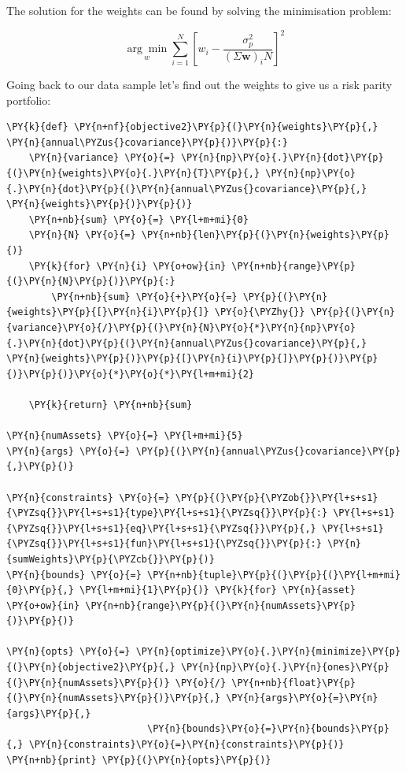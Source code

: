 The solution for the weights can be found by solving the minimisation
problem:

\[ \underset{w}{\arg \min } \sum _{i=1}^{N}\left[w_{i}-{\frac {\sigma_p^{2}}{(\Sigma \mathbf{w})_{i}N}}\right]^{2} \]

Going back to our data sample let's find out the weights to give us a
risk parity portfolio:

\begin{tcolorbox}[breakable, size=fbox, boxrule=1pt, pad at break*=1mm,colback=cellbackground, colframe=cellborder]
\begin{Verbatim}[commandchars=\\\{\}]
\PY{k}{def} \PY{n+nf}{objective2}\PY{p}{(}\PY{n}{weights}\PY{p}{,} \PY{n}{annual\PYZus{}covariance}\PY{p}{)}\PY{p}{:}
    \PY{n}{variance} \PY{o}{=} \PY{n}{np}\PY{o}{.}\PY{n}{dot}\PY{p}{(}\PY{n}{weights}\PY{o}{.}\PY{n}{T}\PY{p}{,} \PY{n}{np}\PY{o}{.}\PY{n}{dot}\PY{p}{(}\PY{n}{annual\PYZus{}covariance}\PY{p}{,} \PY{n}{weights}\PY{p}{)}\PY{p}{)}
    \PY{n+nb}{sum} \PY{o}{=} \PY{l+m+mi}{0}
    \PY{n}{N} \PY{o}{=} \PY{n+nb}{len}\PY{p}{(}\PY{n}{weights}\PY{p}{)}
    \PY{k}{for} \PY{n}{i} \PY{o+ow}{in} \PY{n+nb}{range}\PY{p}{(}\PY{n}{N}\PY{p}{)}\PY{p}{:}
        \PY{n+nb}{sum} \PY{o}{+}\PY{o}{=} \PY{p}{(}\PY{n}{weights}\PY{p}{[}\PY{n}{i}\PY{p}{]} \PY{o}{\PYZhy{}} \PY{p}{(}\PY{n}{variance}\PY{o}{/}\PY{p}{(}\PY{n}{N}\PY{o}{*}\PY{n}{np}\PY{o}{.}\PY{n}{dot}\PY{p}{(}\PY{n}{annual\PYZus{}covariance}\PY{p}{,} \PY{n}{weights}\PY{p}{)}\PY{p}{[}\PY{n}{i}\PY{p}{]}\PY{p}{)}\PY{p}{)}\PY{p}{)}\PY{o}{*}\PY{o}{*}\PY{l+m+mi}{2}
        
    \PY{k}{return} \PY{n+nb}{sum}

\PY{n}{numAssets} \PY{o}{=} \PY{l+m+mi}{5}
\PY{n}{args} \PY{o}{=} \PY{p}{(}\PY{n}{annual\PYZus{}covariance}\PY{p}{,}\PY{p}{)}

\PY{n}{constraints} \PY{o}{=} \PY{p}{(}\PY{p}{\PYZob{}}\PY{l+s+s1}{\PYZsq{}}\PY{l+s+s1}{type}\PY{l+s+s1}{\PYZsq{}}\PY{p}{:} \PY{l+s+s1}{\PYZsq{}}\PY{l+s+s1}{eq}\PY{l+s+s1}{\PYZsq{}}\PY{p}{,} \PY{l+s+s1}{\PYZsq{}}\PY{l+s+s1}{fun}\PY{l+s+s1}{\PYZsq{}}\PY{p}{:} \PY{n}{sumWeights}\PY{p}{\PYZcb{}}\PY{p}{)}
\PY{n}{bounds} \PY{o}{=} \PY{n+nb}{tuple}\PY{p}{(}\PY{p}{(}\PY{l+m+mi}{0}\PY{p}{,} \PY{l+m+mi}{1}\PY{p}{)} \PY{k}{for} \PY{n}{asset} \PY{o+ow}{in} \PY{n+nb}{range}\PY{p}{(}\PY{n}{numAssets}\PY{p}{)}\PY{p}{)}

\PY{n}{opts} \PY{o}{=} \PY{n}{optimize}\PY{o}{.}\PY{n}{minimize}\PY{p}{(}\PY{n}{objective2}\PY{p}{,} \PY{n}{np}\PY{o}{.}\PY{n}{ones}\PY{p}{(}\PY{n}{numAssets}\PY{p}{)} \PY{o}{/} \PY{n+nb}{float}\PY{p}{(}\PY{n}{numAssets}\PY{p}{)}\PY{p}{,} \PY{n}{args}\PY{o}{=}\PY{n}{args}\PY{p}{,}
                         \PY{n}{bounds}\PY{o}{=}\PY{n}{bounds}\PY{p}{,} \PY{n}{constraints}\PY{o}{=}\PY{n}{constraints}\PY{p}{)}
\PY{n+nb}{print} \PY{p}{(}\PY{n}{opts}\PY{p}{)}  


\end{Verbatim}
\end{tcolorbox}
